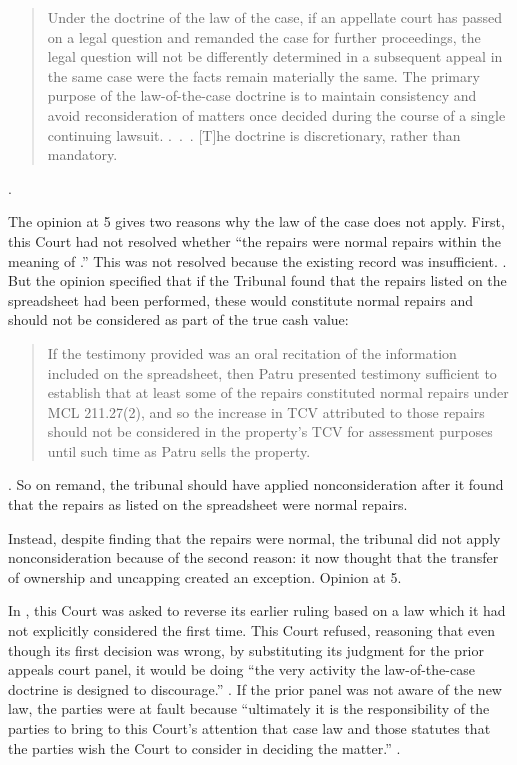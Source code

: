 \documentclass[12pt,\documentclassflag]{michiganCourtOfAppealsBrief}
\begin{document}
\begin{quote}
  Under the doctrine of the law of the case, if an appellate court has passed on a legal question and remanded the case for further proceedings, the legal question will not be differently determined in a subsequent appeal in the same case were the facts remain materially the same. The primary purpose of the law-of-the-case doctrine is to maintain consistency and avoid reconsideration of matters once decided during the course of a single  %
  continuing lawsuit. .~.~.  [T]he doctrine is discretionary, rather than mandatory.
\end{quote}
.

The opinion at 5 gives two reasons why the law of the case does not apply. First,
this Court had not resolved whether ``the repairs were normal repairs within the meaning of \mathieuGast.'' This was not resolved because the existing record was insufficient. . But the opinion specified that if the Tribunal found that the repairs listed on the spreadsheet had been performed, these would constitute normal repairs and should not be considered as part of the true cash value:

\begin{quote}
  If the testimony provided was an oral recitation of the
information included on the spreadsheet, then Patru presented testimony sufficient to establish
that at least some of the repairs constituted normal repairs under MCL 211.27(2), and so the
increase in TCV attributed to those repairs should not be considered in the property's TCV for
assessment purposes until such time as Patru sells the property.
\end{quote}
. So on remand, the tribunal should have applied nonconsideration after it found that the repairs as listed on the spreadsheet were normal repairs.

Instead, despite finding that the repairs were normal, the tribunal did not apply nonconsideration because of the second reason: it now thought that the transfer of ownership and uncapping created an exception. Opinion at 5. %

In \cite[s]{Bennett}, this Court was asked to reverse its earlier ruling based on a law which it had not explicitly considered the first time. This Court refused, reasoning that even though its first decision was wrong, by substituting its judgment for the prior appeals court panel, it would be doing ``the very activity the law-of-the-case doctrine is designed to discourage.'' . If the prior panel was not aware of the new law, the parties were at fault because ``ultimately it is the responsibility of the parties to bring to this Court's attention that case law and those statutes that the parties wish the Court to consider in deciding the matter.'' .
\end{document}
